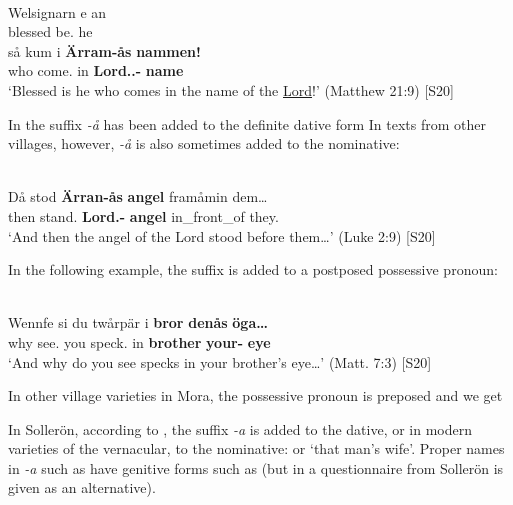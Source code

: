 \ea%
\\
\gll Welsignarn  e  an\\
blessed  be.{\prs}  he\\
\gll så  kum  i  \textbf{Ärram-ås} \textbf{nammen!}\\
who  come.{\prs}  in  \textbf{Lord.{}.{\dat}-{\poss}} \textbf{name}\\
\glt ‘Blessed is he who comes in the name of the \href{http://www.godrules.net/library/topics/topic1192.htm}{Lord}!’ (Matthew 21:9) [S20]
\z

In  the suffix\textit{ {}-å} has been added to the definite dative form In texts from other villages, however,\textit{ {}-å} is also sometimes added to the nominative:

\ea%
\\
\gll Då  stod  \textbf{Ärran-ås} \textbf{angel} framåmin  dem…\\
then  stand.{\pst}  \textbf{Lord.{}-{\poss}} \textbf{angel} in\_front\_of  they.{\obl}\\
\glt ‘And then the angel of the Lord stood before them…’ (Luke 2:9) [S20]
\z

In the following example, the suffix is added to a postposed possessive pronoun:

\ea%
\\
\gll Wennfe  si  du  twårpär  i  \textbf{bror} \textbf{denås} \textbf{öga…}\\
why  see.{\prs}  you  speck.{\pl}  in  \textbf{brother} \textbf{your-{\poss}} \textbf{eye}\\
\glt ‘And why do you see specks in your brother’s eye…’ (Matt. 7:3) [S20]
\z

In other village varieties in Mora, the possessive pronoun is preposed and we get 

In Sollerön, according to \citet[357]{AnderssonEtAl1999}, the suffix\textit{ {}-a} is added to the dative, or in modern varieties of the vernacular, to the nominative:  or  ‘that man’s wife’. Proper names in\textit{ {}-a} such as  have genitive forms such as (but in a questionnaire from Sollerön  is given as an alternative).

